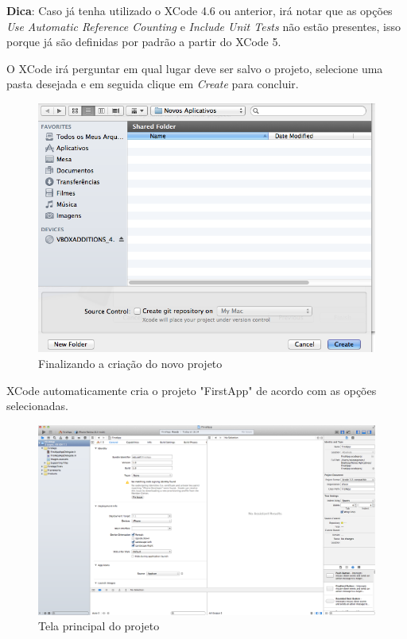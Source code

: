 \documentclass[a4paper,12pt,brazil,doubleside]{book}
\begin{document}
\begin{singlespace}
\begin{framed}
\textbf{Dica}: Caso já tenha utilizado o XCode 4.6 ou anterior, irá notar que as opções 
\textit{ Use Automatic Reference Counting } e \textit{ Include Unit Tests } não estão presentes, isso porque já são definidas por padrão a partir do XCode 5.
\end{framed}

O XCode irá perguntar em qual lugar deve ser salvo o projeto, selecione uma pasta desejada e em seguida clique em \emph{Create} para concluir. 

\begin{figure}[H]
  \centering
  \includegraphics[width=.75\textwidth]{figuras/3/tela_novo_projeto_3.png}
  \caption{Finalizando a criação do novo projeto}
  \label{fig:a}
\end{figure}

XCode automaticamente cria o projeto "FirstApp" de acordo com as opções selecionadas.

\begin{figure}[H]
  \centering
  \includegraphics[width=.99\textwidth]{figuras/3/tela_novo_projeto_4.png}
  \caption{Tela principal do projeto}
  \label{fig:a}
\end{figure}


\end{singlespace}
\end{document}

